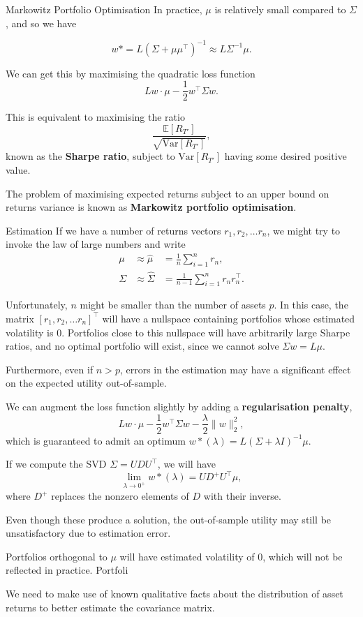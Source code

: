\documentclass{beamer}
\begin{document}
\begin{frame}{Markowitz Portfolio Optimisation}
	In practice, $\mu$ is relatively small compared to $\Sigma$, and so we have

	$$w* = L(\Sigma+\mu\mu^\top)^{-1}\approx L\Sigma^{-1}\mu.$$

	We can get this by maximising the quadratic loss function
	$$Lw\cdot \mu - \frac{1}{2}w^\top \Sigma w.$$

	This is equivalent to maximising the ratio
	$$\frac{\mathbb{E}[R_{T'}]}{\sqrt{\mathrm{Var}[R_{T'}]}},$$
	known as the \textbf{Sharpe ratio}, subject to $\mathrm{Var}[R_{T'}]$ having some desired positive value. %

	The problem of maximising expected returns subject to an upper bound on returns variance is known as \textbf{Markowitz portfolio optimisation}.%

\end{frame}

\begin{frame}{Estimation}
	If we have a number of returns vectors $r_1,r_2,\ldots r_n$, we might try to invoke the law of large numbers and write
	\begin{align*}
		\mu	&\approx \hat{\mu}	&= \frac{1}{n} \sum_{i=1}^n r_n,
	\\	\Sigma	&\approx \hat{\Sigma}	&= \frac{1}{n-1} \sum_{i=1}^n r_n r_n^\top.
	\end{align*}

	Unfortunately, $n$ might be smaller than the number of assets $p$. In this case, the matrix $[r_1,r_2,\ldots r_n]^\top$ will have a nullspace containing portfolios whose estimated volatility is $0$. Portfolios close to this nullspace will have arbitrarily large Sharpe ratios, and no optimal portfolio will exist, since we cannot solve $\Sigma w = L\mu$.

	Furthermore, even if $n>p$, errors in the estimation may have a significant effect on the expected utility out-of-sample.

	We can augment the loss function slightly by adding a \textbf{regularisation penalty},
	$$Lw\cdot\mu-\frac{1}{2}w^\top\Sigma w-\frac{\lambda}{2}\|w\|_2^2,$$
	which is guaranteed to admit an optimum $w*(\lambda) = L(\Sigma+\lambda I)^{-1}\mu$.

	If we compute the SVD $\Sigma=UDU^\top$, we will have
	$$\lim_{\lambda\to 0^+}w*(\lambda) = UD^+U^\top\mu,$$
	where $D^+$ replaces the nonzero elements of $D$ with their inverse.%

	Even though these produce a solution, the out-of-sample utility may still be unsatisfactory due to estimation error.

	Portfolios orthogonal to $\mu$ will have estimated volatility of $0$, which will not be reflected in practice. Portfoli

	We need to make use of known qualitative facts about the distribution of asset returns to better estimate the covariance matrix.
\end{frame}
\end{document}
